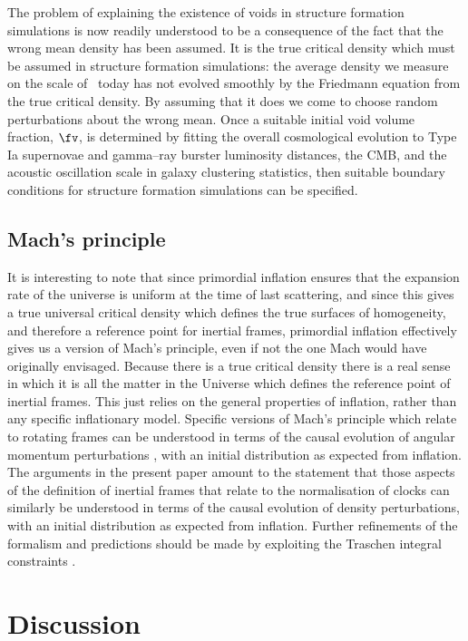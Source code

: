 \documentclass[12pt]{iopart}
\begin{document}
The problem of explaining the existence of voids in structure formation
simulations is now readily understood to be a consequence of the fact that
the wrong mean density has been assumed. It is the true critical density
which must be assumed in structure formation simulations: the average
density we measure on the scale of \SS\ today has not evolved smoothly
by the Friedmann equation from the true critical density. By assuming
that it does we come to choose random perturbations about the wrong mean.
Once a suitable initial void volume fraction, $\fv$, is determined by fitting
the overall cosmological evolution to Type Ia supernovae and gamma--ray
burster luminosity distances, the CMB, and the acoustic oscillation scale
in galaxy clustering statistics, then suitable boundary conditions for
structure formation simulations can be specified.

\subsection{Mach's principle}

It is interesting to note that since primordial inflation ensures that
the expansion rate of the universe is uniform at the time of last
scattering, and since this gives a true universal critical density which
defines the true surfaces of homogeneity, and therefore a reference
point for inertial frames, primordial inflation effectively gives us a
version of Mach's principle, even if not the one Mach would have originally
envisaged. Because there is a true critical density there is a real sense
in which it is all the matter in the Universe which defines the reference
point of inertial frames. This
just relies on the general properties of inflation, rather than any
specific inflationary model. Specific versions of Mach's principle
which relate to rotating frames can be understood in terms of the
causal evolution of angular momentum perturbations \cite{Mach1,Mach2},
with an initial distribution as expected from inflation. The arguments in
the present paper amount to the statement that those aspects of
the definition of inertial frames that relate to the normalisation of
clocks can similarly be understood in terms of the causal evolution
of density perturbations, with an initial distribution as expected from
inflation. Further refinements of the formalism and predictions should be made
by exploiting the Traschen integral constraints \cite{Traschen1,Traschen2}.

\section{Discussion\label{dis}}
\end{document}
